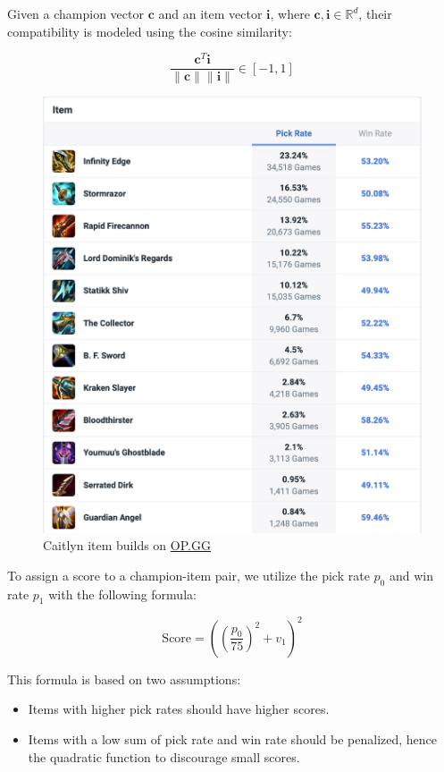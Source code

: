 \documentclass[11pt,a4paper,oneside]{report}
\begin{document}
Given a champion vector $\mathbf{c}$ and an item vector $\mathbf{i}$, where $\mathbf{c}, \mathbf{i} \in \mathbb{R}^d$, their compatibility is modeled using the cosine similarity:

\[\frac{\mathbf{c}^T\mathbf{i}}{\|\mathbf{c}\| \|\mathbf{i}\|} \in [-1, 1]\]

\begin{figure}[htbp]
  \centering
  \includegraphics[height=0.45\textheight]{assets/opgg_caitlyn_builds.png}
  \caption{Caitlyn item builds on \href{https://www.op.gg/}{OP.GG} \cite{opgg-caitlyn-builds}}
  \label{fig:opgg_caitlyn_builds}
\end{figure}

To assign a score to a champion-item pair, we utilize the pick rate $p_0$ and win rate $p_1$ with the following formula:

\[\text{Score} = ((\frac{p_0}{75})^2 + v_1)^2 \]

This formula is based on two assumptions:

\begin{itemize}
  \item Items with higher pick rates should have higher scores.
  \item Items with a low sum of pick rate and win rate should be penalized, hence the quadratic function to discourage small scores.
\end{itemize}
\end{document}
